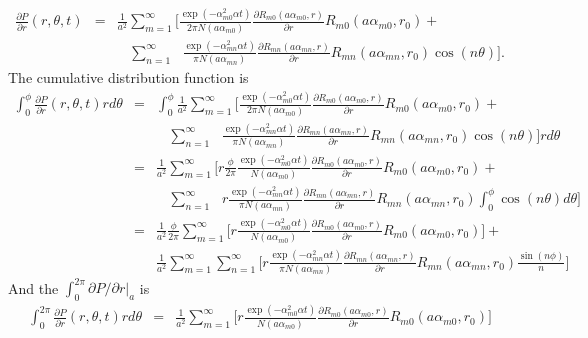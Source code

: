 \documentclass{article}
\begin{document}
\begin{eqnarray}
    \frac{\partial P}{\partial r}(r, \theta, t) &=&
    \frac{1}{a^2} \sum_{m=1}^{\infty} \Bigg[
    \frac{\exp(-\alpha_{m0}^2\alpha t)}{2\pi N(a\alpha_{m0})}
    \frac{\partial R_{m0}(a\alpha_{m0}, r)}{\partial r} R_{m0}(a\alpha_{m0}, r_0) +
\nonumber\\
    & &\ \ \ \ \sum_{n=1}^{\infty}\ \ \ 
    \frac{\exp(-\alpha_{mn}^2\alpha t)}{\pi N(a\alpha_{mn})}
    \frac{\partial R_{mn}(a\alpha_{mn}, r)}{\partial r} R_{mn}(a\alpha_{mn}, r_0)\cos(n\theta)\Bigg].
\end{eqnarray}
%
The cumulative distribution function is
%
\begin{eqnarray}
    \int_0^\phi\frac{\partial P}{\partial r}(r, \theta, t) rd\theta
    &=& \int_0^\phi\frac{1}{a^2} \sum_{m=1}^{\infty} \Bigg[
    \frac{\exp(-\alpha_{m0}^2\alpha t)}{2\pi N(a\alpha_{m0})}
    \frac{\partial R_{m0}(a\alpha_{m0}, r)}{\partial r} R_{m0}(a\alpha_{m0}, r_0) +
\nonumber\\
    & &\ \ \ \ \sum_{n=1}^{\infty}\ \ \ 
    \frac{\exp(-\alpha_{mn}^2\alpha t)}{\pi N(a\alpha_{mn})}
    \frac{\partial R_{mn}(a\alpha_{mn}, r)}{\partial r} R_{mn}(a\alpha_{mn}, r_0)\cos(n\theta)\Bigg] rd\theta
\nonumber\\
    &=& \frac{1}{a^2} \sum_{m=1}^{\infty} \Bigg[
    r\frac{\phi}{2\pi}\frac{\exp(-\alpha_{m0}^2\alpha t)}{N(a\alpha_{m0})}
    \frac{\partial R_{m0}(a\alpha_{m0}, r)}{\partial r} R_{m0}(a\alpha_{m0}, r_0) +
\nonumber\\
    & &\ \ \ \ \sum_{n=1}^{\infty}\ \ \ 
    r\frac{\exp(-\alpha_{mn}^2\alpha t)}{\pi N(a\alpha_{mn})}
    \frac{\partial R_{mn}(a\alpha_{mn}, r)}{\partial r} R_{mn}(a\alpha_{mn}, r_0)
    \int_0^\phi\cos(n\theta)d\theta\Bigg]
\nonumber\\
    &=& \frac{1}{a^2} \frac{\phi}{2\pi} \sum_{m=1}^{\infty} \Bigg[
    r\frac{\exp(-\alpha_{m0}^2\alpha t)}{N(a\alpha_{m0})}
    \frac{\partial R_{m0}(a\alpha_{m0}, r)}{\partial r} R_{m0}(a\alpha_{m0}, r_0)\Bigg] +
\nonumber\\
    & & \frac{1}{a^2}\sum_{m=1}^{\infty}\sum_{n=1}^{\infty} \Bigg[
    r\frac{\exp(-\alpha_{mn}^2\alpha t)}{\pi N(a\alpha_{mn})}
    \frac{\partial R_{mn}(a\alpha_{mn}, r)}{\partial r} R_{mn}(a\alpha_{mn}, r_0)
    \frac{\sin(n\phi)}{n}\Bigg]
\end{eqnarray}
%
And the $\int_0^{2\pi} \partial P / \partial r |_a$ is
%
\begin{eqnarray}
    \int_0^{2\pi}\frac{\partial P}{\partial r}(r, \theta, t) rd\theta
    &=& \frac{1}{a^2} \sum_{m=1}^{\infty} \Bigg[
    r\frac{\exp(-\alpha_{m0}^2\alpha t)}{N(a\alpha_{m0})}
    \frac{\partial R_{m0}(a\alpha_{m0}, r)}{\partial r} R_{m0}(a\alpha_{m0}, r_0)\Bigg]
\end{eqnarray}
\end{document}

